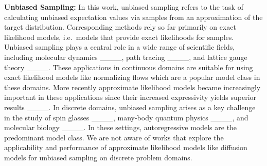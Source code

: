\textbf{Unbiased Sampling:}
In this work, unbiased sampling refers to the task of calculating unbiased expectation values via samples from an approximation of the target distribution. Corresponding methods rely so far primarily on exact likelihood models, i.e.~models that provide exact likelihoods for samples. Unbiased sampling plays a central role in a wide range of scientific fields, including molecular dynamics ____, path tracing ____, and lattice gauge theory ____. These applications in continuous domains are suitable for using exact likelihood models like normalizing flows which are a popular model class in these domains. More recently approximate likelihood models became increasingly important in these applications since their increased expressivity yields superior results ____. In discrete domains, unbiased sampling arises as a key challenge in the study of spin glasses ____,  many-body quantum physics ____, and molecular biology ____. In these settings, autoregressive models are the predominant model class. We are not aware of works that explore the applicability and performance of approximate likelihood models like diffusion models for unbiased sampling on discrete problem domains.